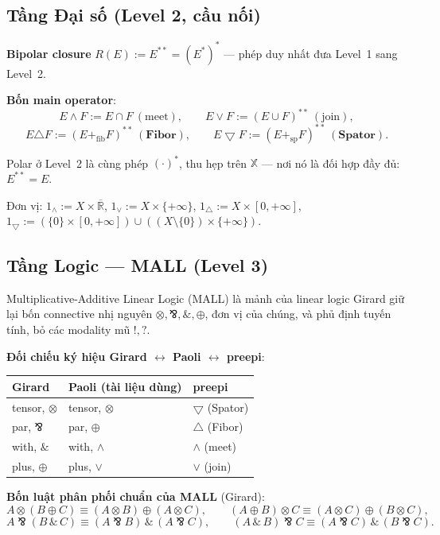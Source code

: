 \documentclass[11pt]{article}
\theoremstyle{plainlabel}
\begin{document}
\subsection{Tầng Đại số (Level 2, cầu nối)}

\textbf{Bipolar closure} $R(E):=E^{**}=(E^*)^*$ — phép duy nhất đưa Level~1 sang Level~2.

\textbf{Bốn main operator}:
\[
E\wedge F:=E\cap F\ (\text{meet}), \qquad E\vee F:=(E\cup F)^{**}\ (\text{join}),
\]
\[
E\triangle F:=(E+_{\mathrm{fib}}F)^{**}\ (\textbf{Fibor}), \qquad E\bigtriangledown F:=(E+_{\mathrm{sp}}F)^{**}\ (\textbf{Spator}).
\]

Polar ở Level~2 là cùng phép $(\cdot)^*$, thu hẹp trên $\mathbb X$ — nơi nó là đối hợp đầy đủ: $E^{**}=E$.

Đơn vị: $1_\wedge:=X\times\overline{\mathbb R}$, $1_\vee:=X\times\{+\infty\}$, $1_\triangle:=X\times[0,+\infty]$, $1_{\bigtriangledown}:=(\{0\}\times[0,+\infty])\cup((X\setminus\{0\})\times\{+\infty\})$.

\subsection{Tầng Logic — MALL (Level 3)}

Multiplicative-Additive Linear Logic (MALL) là mảnh của linear logic Girard giữ lại bốn connective nhị nguyên $\otimes,⅋,\&,\oplus$, đơn vị của chúng, và phủ định tuyến tính, bỏ các modality mũ $!,?$.

\textbf{Đối chiếu ký hiệu Girard $\leftrightarrow$ Paoli $\leftrightarrow$ preepi}:
\begin{center}
\begin{tabular}{lll}
\toprule
Girard & Paoli (tài liệu dùng) & preepi \\
\midrule
tensor, $\otimes$ & tensor, $\otimes$ & $\bigtriangledown$ (Spator) \\
par, $⅋$ & par, $\oplus$ & $\triangle$ (Fibor) \\
with, $\&$ & with, $\wedge$ & $\wedge$ (meet) \\
plus, $\oplus$ & plus, $\vee$ & $\vee$ (join) \\
\bottomrule
\end{tabular}
\end{center}

\textbf{Bốn luật phân phối chuẩn của MALL} (Girard):
\[
A\otimes(B\oplus C)\equiv(A\otimes B)\oplus(A\otimes C), \qquad
(A\oplus B)\otimes C\equiv(A\otimes C)\oplus(B\otimes C),
\]
\[
A⅋(B\,\&\,C)\equiv(A⅋B)\,\&\,(A⅋C), \qquad
(A\,\&\,B)⅋C\equiv(A⅋C)\,\&\,(B⅋C).
\]
\end{document}
